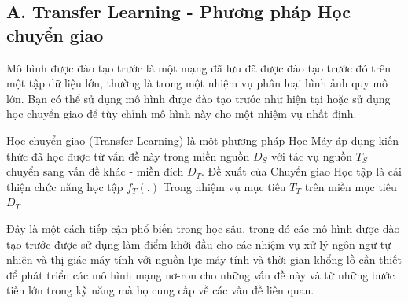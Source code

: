 \documentclass{article}
\begin{document}
	\subsection{A. Transfer Learning - Phương pháp Học chuyển giao}
	Mô hình được đào tạo trước là một mạng đã lưu đã được đào tạo trước đó trên một tập dữ liệu lớn, thường là trong một nhiệm vụ phân loại hình ảnh quy mô lớn. Bạn có thể sử dụng mô hình được đào tạo trước như hiện tại hoặc sử dụng học chuyển giao để tùy chỉnh mô hình này cho một nhiệm vụ nhất định.
	
	Học chuyển giao (Transfer Learning) là một phương pháp Học Máy áp dụng kiến thức đã học được từ vấn đề này trong miền nguồn $ D_{S} $ với tác vụ nguồn $ T_{S}$ chuyển sang vấn đề khác - miền đích $ D_{T} $. Đề xuất của Chuyển giao Học tập là cải thiện chức năng học tập $f_{T}(.)$ Trong nhiệm vụ mục tiêu $ T_{T} $ trên miền mục tiêu $D_{T}$
	
	Đây là một cách tiếp cận phổ biến trong học sâu, trong đó các mô hình được đào tạo trước được sử dụng làm điểm khởi đầu cho các nhiệm vụ xử lý ngôn ngữ tự nhiên và thị giác máy tính với nguồn lực máy tính và thời gian khổng lồ cần thiết để phát triển các mô hình mạng nơ-ron cho những vấn đề này và từ những bước tiến lớn trong kỹ năng mà họ cung cấp về các vấn đề liên quan.
	
\end{document}
